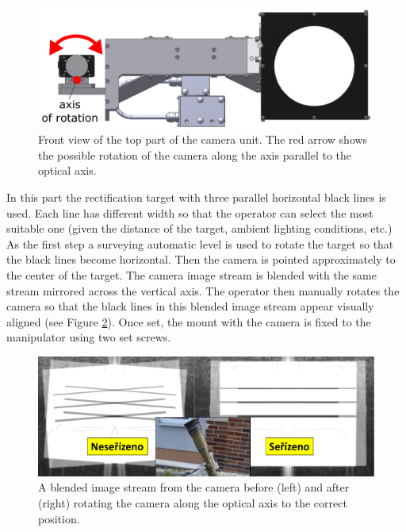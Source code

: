 \begin{figure}[htb]
	\centering
	\includegraphics[width=13cm]{fig/rect_model_front_view.png}
	\caption{Front view of the top part of the camera unit. The red arrow shows the possible rotation of the camera along the axis parallel to the optical axis.}
	\label{fig:rect_model_front_view}
\end{figure}

In this part the rectification target with three parallel horizontal black lines is used. Each line has different width so that the operator can select the most suitable one (given the distance of the target, ambient lighting conditions, etc.) As the first step a surveying automatic level is used to rotate the target so that the black lines become horizontal. Then the camera is pointed approximately to the center of the target. The camera image stream is blended with the same stream mirrored across the vertical axis. The operator then manually rotates the camera so that the black lines in this blended image stream appear visually aligned (see Figure \ref{fig:rect_mirrored_stream}). Once set, the mount with the camera is fixed to the manipulator using two set screws.

\begin{figure}[htb]
	\centering
	\includegraphics[width=13cm]{fig/rect_mirrored_stream.png}
	\caption{A blended image stream from the camera before (left) and after (right) rotating the camera along the optical axis to the correct position.}
	\label{fig:rect_mirrored_stream}
\end{figure}

